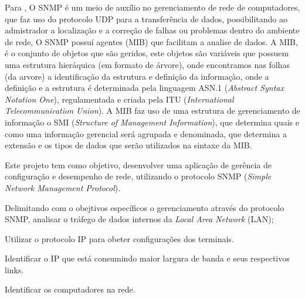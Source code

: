 \par Para , O SNMP é um meio de auxílio no
gerenciamento de rede de computadores, que faz uso do protocolo UDP para a
transferência de dados, possibilitando ao admistrador a
localização e a correção de falhas ou problemas dentro do ambiente de rede, O
SNMP possuí agentes (MIB) que facilitam a analise de dados. 
A MIB, é o conjunto de objetos que são geridos, este objetos são variáveis que
possuem uma estrutura hieráquica (em formato de árvore), onde encontramos nas
folhas (da arvore) a identificação da estrutura e definição da informação, onde
a definição e a estrutura é determinada pela linguagem ASN.1 (\textit{Abstract Syntax Notation One}),
regulamentada e criada pela ITU (\textit{International Telecommunication
Union}). A MIB faz uso de uma estrutura de gerenciamento de informação o SMI
(\textit{Structure of Management Information}), que determina quais e como uma
informação gerencial será agrupada e denominada, que determina a extensão e os
tipos de dados que serão utilizados na sintaxe da MIB.




\par Este projeto tem como objetivo, desenvolver uma aplicação de gerência de
configuração e desempenho de rede, utilizando o protocolo SNMP (\textit{Simple Network Management Protocol}).

\par Delimitando com o obejtivos específicos o gerenciamento através do
protocolo SNMP, analisar o tráfego de dados internos da \textit{Local Area Network} (LAN); 

\par Utilizar o protocolo IP para obeter configurações dos terminais.

\par Identificar o IP que está consumindo maior largura de banda e seus
respectivos links.

\par Identificar os computadores na rede.

